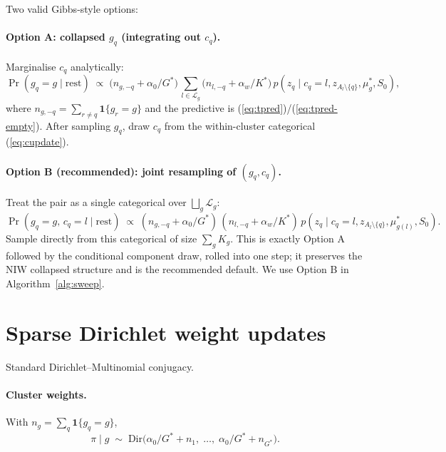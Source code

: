 \documentclass[11pt]{article}
\newcommand{\ind}{\mathbf{1}}
\newcommand{\Dir}{\mathrm{Dir}}
\begin{document}
Two valid Gibbs-style options:

\paragraph{Option A: collapsed $g_q$ (integrating out $c_q$).}
Marginalise $c_q$ analytically:
\begin{equation}
\Pr(g_q=g\mid\mathrm{rest}) \;\propto\;
\bigl(n_{g,-q} + \alpha_0/G^*\bigr)\,
\sum_{l\in\mathcal{L}_g}\bigl(n_{l,-q}+\alpha_w/K^*\bigr)\,
p(z_q\mid c_q=l,z_{A_l\setminus\{q\}},\mu_g^*,S_0),
\label{eq:goptA}
\end{equation}
where $n_{g,-q}=\sum_{r\ne q}\ind\{g_r=g\}$ and the predictive is
(\ref{eq:tpred})/(\ref{eq:tpred-empty}). After sampling $g_q$, draw $c_q$
from the within-cluster categorical (\ref{eq:cupdate}).

\paragraph{Option B (recommended): joint resampling of $(g_q,c_q)$.}
Treat the pair as a single categorical over
$\bigsqcup_g \mathcal{L}_g$:
\begin{equation}
\Pr(g_q=g,\,c_q=l\mid\mathrm{rest})\;\propto\;
(n_{g,-q}+\alpha_0/G^*)\,
(n_{l,-q}+\alpha_w/K^*)\,
p(z_q\mid c_q=l,z_{A_l\setminus\{q\}},\mu_{g(l)}^*,S_0).
\label{eq:goptB}
\end{equation}
Sample directly from this categorical of size $\sum_g K_g$. This is
exactly Option A followed by the conditional component draw, rolled into
one step; it preserves the NIW collapsed structure and is the recommended
default. We use Option B in Algorithm~\ref{alg:sweep}.

\section{Sparse Dirichlet weight updates}
\label{sec:weight-update}

Standard Dirichlet--Multinomial conjugacy.

\paragraph{Cluster weights.} With $n_g=\sum_q\ind\{g_q=g\}$,
\begin{equation}
\pi\mid g \;\sim\; \Dir\!\bigl(\alpha_0/G^*+n_1,\;\ldots,\;\alpha_0/G^*+n_{G^*}\bigr).
\label{eq:pi-update}
\end{equation}
\end{document}
